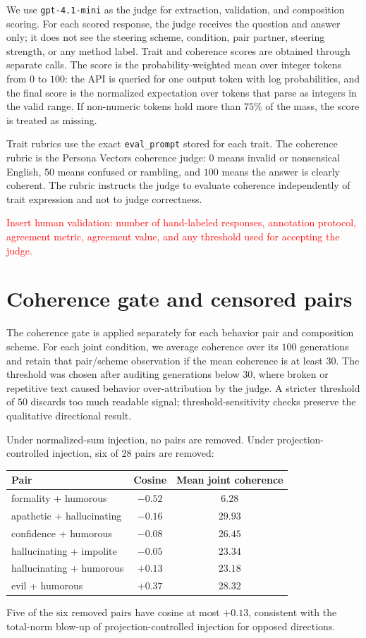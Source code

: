 \documentclass{article}
\begin{document}
We use \texttt{gpt-4.1-mini} as the judge for extraction, validation, and composition scoring. For
each scored response, the judge receives the question and answer only; it does not see the steering
scheme, condition, pair partner, steering strength, or any method label. Trait and coherence scores
are obtained through separate calls. The score is the probability-weighted mean over integer tokens
from $0$ to $100$: the API is queried for one output token with log probabilities, and the final
score is the normalized expectation over tokens that parse as integers in the valid range. If
non-numeric tokens hold more than $75\%$ of the mass, the score is treated as missing.

Trait rubrics use the exact \texttt{eval\_prompt} stored for each trait. The coherence rubric is the
Persona Vectors coherence judge: $0$ means invalid or nonsensical English, $50$ means confused or
rambling, and $100$ means the answer is clearly coherent. The rubric instructs the judge to evaluate
coherence independently of trait expression and not to judge correctness.

\textcolor{red}{Insert human validation: number of hand-labeled responses, annotation protocol,
agreement metric, agreement value, and any threshold used for accepting the judge.}

\section{Coherence gate and censored pairs}
\label{app:coherence}

The coherence gate is applied separately for each behavior pair and composition scheme. For each
joint condition, we average coherence over its $100$ generations and retain that pair/scheme
observation if the mean coherence is at least $30$. The threshold was chosen after auditing
generations below $30$, where broken or repetitive text caused behavior over-attribution by the
judge. A stricter threshold of $50$ discards too much readable signal; threshold-sensitivity checks
preserve the qualitative directional result.

Under normalized-sum injection, no pairs are removed. Under projection-controlled injection, six of
$28$ pairs are removed:
\begin{center}
\small
\begin{tabular}{lcc}
\toprule
Pair & Cosine & Mean joint coherence \\
\midrule
formality + humorous & $-0.52$ & $6.28$ \\
apathetic + hallucinating & $-0.16$ & $29.93$ \\
confidence + humorous & $-0.08$ & $26.45$ \\
hallucinating + impolite & $-0.05$ & $23.34$ \\
hallucinating + humorous & $+0.13$ & $23.18$ \\
evil + humorous & $+0.37$ & $28.32$ \\
\bottomrule
\end{tabular}
\end{center}
Five of the six removed pairs have cosine at most $+0.13$, consistent with the total-norm blow-up of
projection-controlled injection for opposed directions.
\end{document}
